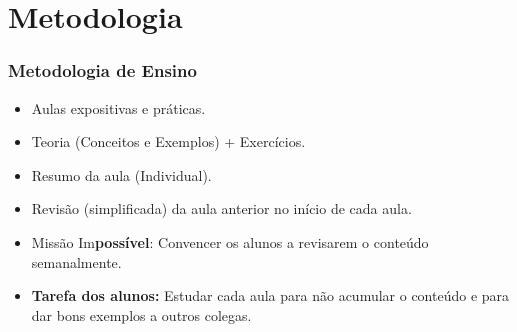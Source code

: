 \documentclass{beamer}
\begin{document}
\section[Metodologia]{Metodologia}
\begin{frame}
	\frametitle{Metodologia de Ensino}
	\fontsize{14pt}{7.2}\selectfont
	\begin{minipage}[t][\textheight][t]{\textwidth}
		\begin{itemize}
			\item  Aulas expositivas e práticas.
			\item Teoria (Conceitos e Exemplos) + Exercícios.
			\item Resumo da aula (Individual).
			\item Revisão (simplificada) da aula anterior no início de cada aula.
			\item Missão Im\textbf{possível}: Convencer os alunos a revisarem o conteúdo semanalmente.
			\item \textbf{Tarefa dos alunos:} Estudar cada aula para não acumular o conteúdo e para dar bons exemplos a outros colegas.
		\end{itemize}
	\end{minipage}
\end{frame}
\end{document}
